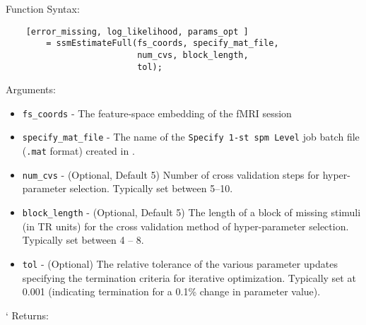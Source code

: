 Function Syntax:
\begin{verbatim}
    [error_missing, log_likelihood, params_opt ]
        = ssmEstimateFull(fs_coords, specify_mat_file,
                          num_cvs, block_length,
                          tol);
\end{verbatim}
Arguments:
\begin{itemize}
  \item \verb"fs_coords" - The feature-space embedding of the fMRI session
  \item \verb"specify_mat_file" - The name of the \verb"Specify 1-st spm Level"
   job batch file (\verb".mat" format) created in .
  \item \verb"num_cvs" - (Optional, Default 5) Number of cross validation steps for hyper-parameter selection.
  Typically set between 5--10.
  \item \verb"block_length" - (Optional, Default 5)  The length of a block of missing stimuli (in TR units)
     for the cross validation method of hyper-parameter selection. Typically set
     between 4 -- 8.
  \item \verb"tol" - (Optional) The relative tolerance of the various
  parameter updates specifying the termination criteria for iterative optimization. Typically
  set at 0.001 (indicating termination for a 0.1\% change in parameter value).
\end{itemize}`
Returns:
